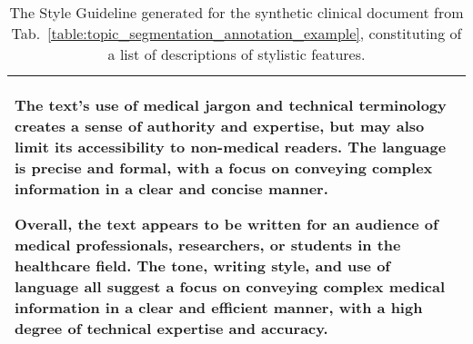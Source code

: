 \begin{table*}[ht]
{\begin{tabular}{p{\textwidth}}
The text's use of medical jargon and technical terminology creates a sense of authority and expertise, but may also limit its accessibility to non-medical readers. The language is precise and formal, with a focus on conveying complex information in a clear and concise manner.

Overall, the text appears to be written for an audience of medical professionals, researchers, or students in the healthcare field. The tone, writing style, and use of language all suggest a focus on conveying complex medical information in a clear and efficient manner, with a high degree of technical expertise and accuracy.
\\
\hline
\end{tabular}
}

\caption{The Style Guideline generated for the synthetic clinical document from Tab.~\ref{table:topic_segmentation_annotation_example}, constituting of a list of descriptions of stylistic features.}
\label{table:style_guideline_example}
\end{table*}


